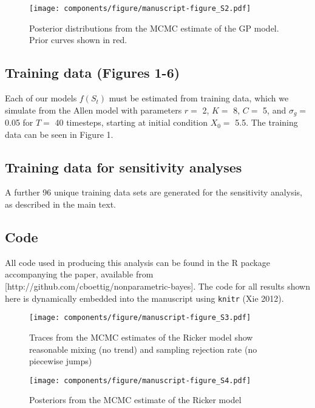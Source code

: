 \documentclass[author-year, 12pt,review]{elsarticle} %
\makeatletter
\def\maxwidth{\ifdim\Gin@nat@width>\linewidth\linewidth
\else\Gin@nat@width\fi}
\let\Oldincludegraphics\includegraphics
\renewcommand{\includegraphics}[1]{\Oldincludegraphics[width=\maxwidth]{#1}}
\makeatother
\begin{document}
\begin{figure}[htbp]
\centering
\texttt{[image: components/figure/manuscript-figure\_S2.pdf]}
\caption{Posterior distributions from the MCMC estimate of the GP model.
Prior curves shown in red.}
\end{figure}

\newpage

\subsection{Training data (Figures
1-6)}\label{training-data-figures-1-6}

Each of our models $f(S_t)$ must be estimated from training data, which
we simulate from the Allen model with parameters $r = $ 2, $K =$ 8,
$C =$ 5, and $\sigma_g =$ 0.05 for $T=$ 40 timesteps, starting at
initial condition $X_0 = $ 5.5. The training data can be seen in Figure
1.

\subsection{Training data for sensitivity
analyses}\label{training-data-for-sensitivity-analyses}

A further 96 unique training data sets are generated for the sensitivity
analysis, as described in the main text.

\subsection{Code}\label{code}

All code used in producing this analysis can be found in the R package
accompanying the paper, available from
{[}http://github.com/cboettig/nonparametric-bayes{]}. The code for all
results shown here is dynamically embedded into the manuscript using
\texttt{knitr} (Xie 2012).

\begin{figure}[htbp]
\centering
\texttt{[image: components/figure/manuscript-figure\_S3.pdf]}
\caption{Traces from the MCMC estimates of the Ricker model show
reasonable mixing (no trend) and sampling rejection rate (no piecewise
jumps)}
\end{figure}

\begin{figure}[htbp]
\centering
\texttt{[image: components/figure/manuscript-figure\_S4.pdf]}
\caption{Posteriors from the MCMC estimate of the Ricker model}
\end{figure}
\end{document}
